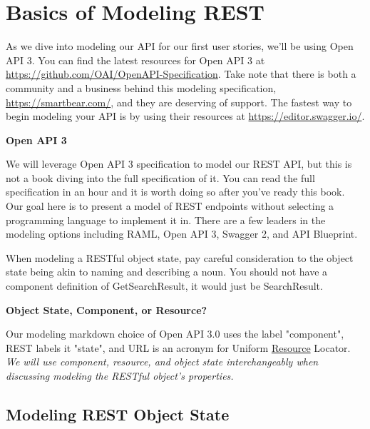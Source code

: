 \chapter{Basics of Modeling REST}

As we dive into modeling our API for our first user stories, we'll be using Open API 3.  You can find the latest resources for Open API 3 at \url{https://github.com/OAI/OpenAPI-Specification}.  Take note that there is both a community and a business behind this modeling specification, \url{https://smartbear.com/}, and they are deserving of support.  The fastest way to begin modeling your API is by using their resources at \url{https://editor.swagger.io/}.

\begin{sidebar}
\begin{center}
\textbf{Open API 3}
\end{center}

We will leverage Open API 3 specification to model our REST API, but this is not a book diving into the full specification of it.  You can read the full specification in an hour and it is worth doing so after you've ready this book.  Our goal here is to present a model of REST endpoints without selecting a programming language to implement it in.  There are a few leaders in the modeling options including RAML, Open API 3, Swagger 2, and API Blueprint.

\end{sidebar}

When modeling a RESTful object state, pay careful consideration to the object state being akin to naming and describing a noun.  You should not have a component definition of GetSearchResult, it would just be SearchResult.

\begin{sidebar}
\begin{center}
\textbf{Object State, Component, or Resource?}
\end{center}

Our modeling markdown choice of Open API 3.0 uses the label "component", REST labels it "state", and URL is an acronym for Uniform \underline{Resource} Locator.  \textit{We will use component, resource, and object state interchangeably when discussing modeling the RESTful object's properties.}

\end{sidebar}

\section{Modeling REST Object State}


